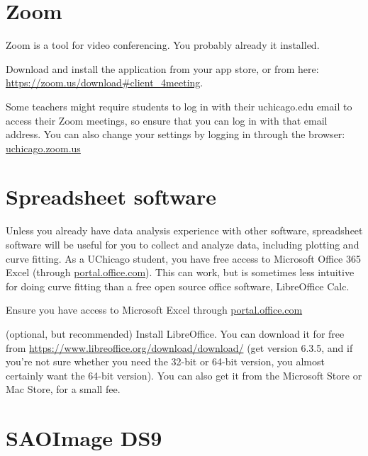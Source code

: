 \section{Zoom}

Zoom is a tool for video conferencing. You probably already it installed.

\begin{steps}
	\item Download and install the application from your app store, or from here: \url{https://zoom.us/download\#client_4meeting}.
	
	\item Some teachers might require students to log in with their uchicago.edu email to access their Zoom meetings, so ensure that you can log in with that email address. You can also change your settings by logging in through the browser: \url{uchicago.zoom.us}
\end{steps}

\section{Spreadsheet software}

Unless you already have data analysis experience with other software, spreadsheet software will be useful for you to collect and analyze data, including plotting and curve fitting. As a UChicago student, you have free access to Microsoft Office 365 Excel (through \url{portal.office.com}). This can work, but is sometimes less intuitive for doing curve fitting than a free open source office software, LibreOffice Calc.

\begin{steps}
	\item Ensure you have access to Microsoft Excel through \url{portal.office.com}
	
	\item (optional, but recommended) Install LibreOffice. You can download it for free from \url{https://www.libreoffice.org/download/download/} (get version 6.3.5, and if you're not sure whether you need the 32-bit or 64-bit version, you almost certainly want the 64-bit version). You can also get it from the Microsoft Store or Mac Store, for a small fee.
\end{steps}

\section{SAOImage DS9}

